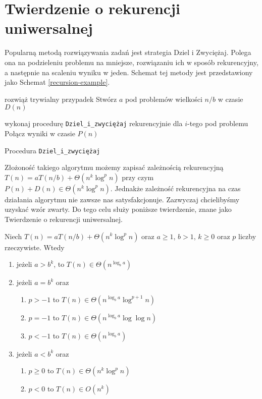 \section{Twierdzenie o rekurencji uniwersalnej}

\label{sec:mastertheorem}

Popularną metodą rozwiązywania zadań jest strategia Dziel i Zwyciężaj.
Polega ona na podzieleniu problemu na mniejsze, rozwiązaniu ich w sposób rekurencyjny, a następnie na scaleniu wyniku w jeden.
Schemat tej metody jest przedstawiony jako Schemat \ref{recursion-example}.
\begin{algorithm}[h]
  \DontPrintSemicolon
    
  {
    rozwiąż trywialny przypadek
  }
  Stwórz $a$ pod problemów wielkości $n/b$ w czasie $D(n)$
  
  
  {
   	wykonaj procedurę \texttt{Dziel\_i\_zwyciężaj} rekurencyjnie dla $i$-tego pod problemu
  }
  Połącz wyniki w czasie $P(n)$
  \caption{Procedura \texttt{Dziel\_i\_zwyciężaj}}
  \label{recursion-example}
\end{algorithm}

Złożoność takiego algorytmu możemy zapisać zależnością rekurencyjną $T(n) = aT(n/b) + \Theta(n^k \log^{p} n)$ przy czym $P(n) + D(n) \in \Theta(n^k \log^{p} n)$.
Jednakże zależność rekurencyjna na czas działania algorytmu nie zawsze nas satysfakcjonuje.
Zazwyczaj chcielibyśmy uzyskać wzór zwarty.
Do tego celu służy poniższe twierdzenie, znane jako Twierdzenie o rekurencji uniwersalnej.

\begin{theorem}
 Niech $T(n) = aT(n/b) + \Theta(n^k \log^{p} n)$ oraz $a \geq 1$, $b > 1$, $k \geq 0$ oraz $p$ liczby rzeczywiste.
 Wtedy
\begin{enumerate}
\item jeżeli $a > b^k$, to $T(n) \in \Theta(n^{\log_b a})$ \label{mt-1}
\item jeżeli $a = b^k$ oraz 
\begin{enumerate}
 \item $p > -1$ to $T(n) \in \Theta(n^{\log_b a} \log^{p + 1} n)$ \label{mt-2a}
 \item $p = -1$ to $T(n) \in \Theta(n^{\log_b a} \log \log n)$ \label{mt-2b}
 \item $p < -1$ to $T(n) \in \Theta(n^{\log_b a})$ \label{mt-2c}
\end{enumerate}
\item jeżeli $a < b^k$ oraz
\begin{enumerate}
 \item $p \geq 0$ to $T(n) \in \Theta(n^k \log^{p} n)$ \label{mt-3a}
 \item $p < 0$ to $T(n) \in O(n^k)$ \label{mt-3b}
\end{enumerate}
\end{enumerate}
 \label{Master}
\end{theorem}

